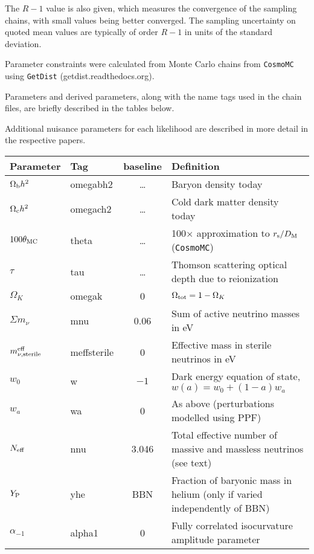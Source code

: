 The $R-1$ value is also given, which measures the convergence of the sampling chains, with small values being better converged. The sampling uncertainty on quoted mean values are typically of order $R-1$ in units of the standard deviation.

Parameter constraints were calculated from Monte Carlo chains from {\tt CosmoMC} using {\tt GetDist} (getdist.readthedocs.org).

Parameters and derived parameters, along with the name tags used in the chain files,
are briefly described in the tables below.

Additional nuisance parameters for each likelihood are described in more detail in the
respective papers.

\begin{tabular} {| l | l | c | l |}
\hline
Parameter & Tag & baseline & Definition \\
\hline
\hline
$\Omega_{\rm b}h^2     $ &  omegabh2    &\dots &Baryon density today\\
$\Omega_{\rm c}h^2     $ &  omegach2    &\dots &Cold dark matter density today\\
$100\theta_{\rm MC}    $ &  theta       &\dots &100$\times$ approximation to $r_{\rm s}/D_{\rm M}$ ({\tt CosmoMC})\\
$\tau                  $ &  tau         &\dots &Thomson scattering optical depth due to reionization \\
$\Omega_K              $ &  omegak      & 0 &$\Omega_{\rm tot} = 1 - \Omega_K$ \\
$\Sigma m_\nu          $ &  mnu         & 0.06 &Sum of active neutrino masses in {\rm eV} \\
$m^{\rm eff}_{\nu,{\rm sterile}}   $ &  meffsterile & 0  & Effective mass in sterile neutrinos in {\rm eV} \\
$w_0                   $ &  w           & $-1$ &Dark energy equation of state, $w(a) = w_0 + (1-a) w_a$ \\
$w_a                   $ &  wa          & 0    &As above (perturbations modelled using PPF) \\
$N_{\rm eff}           $ &  nnu         & 3.046 &Total effective number of massive and massless neutrinos (see text) \\
$Y_{\rm P}             $ &  yhe         & BBN  &Fraction of baryonic mass in helium (only if varied independently of BBN)\\
$\alpha_{-1}           $ &  alpha1      & 0 &Fully correlated isocurvature amplitude parameter\\

\end{tabular}
